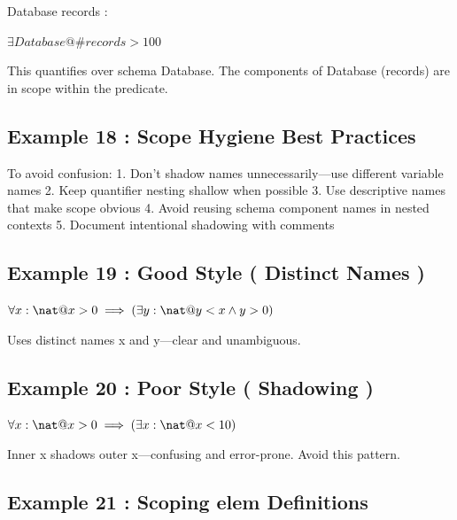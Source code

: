 \documentclass[a4paper,10pt,fleqn]{article}
\begin{document}
\begin{schema}{Database}
records : \power \nat
\end{schema}

\noindent
$\exists Database @ \# records > 100$


\noindent This quantifies over schema Database. The components of Database (records) are in scope within the predicate.

\bigskip

\subsection*{Example 18 : Scope Hygiene Best Practices}

\noindent To avoid confusion: 1. Don't shadow names unnecessarily---use different variable names 2. Keep quantifier nesting shallow when possible 3. Use descriptive names that make scope obvious 4. Avoid reusing schema component names in nested contexts 5. Document intentional shadowing with comments

\bigskip

\subsection*{Example 19 : Good Style ( Distinct Names )}

\noindent
$\forall x : \nat @ x > 0 \implies (\exists y : \nat @ y < x \land y > 0)$


\noindent Uses distinct names x and y---clear and unambiguous.

\bigskip

\subsection*{Example 20 : Poor Style ( Shadowing )}

\noindent
$\forall x : \nat @ x > 0 \implies (\exists x : \nat @ x < 10)$


\noindent Inner x shadows outer x---confusing and error-prone. Avoid this pattern.

\bigskip

\subsection*{Example 21 : Scoping elem Definitions}
\end{document}
